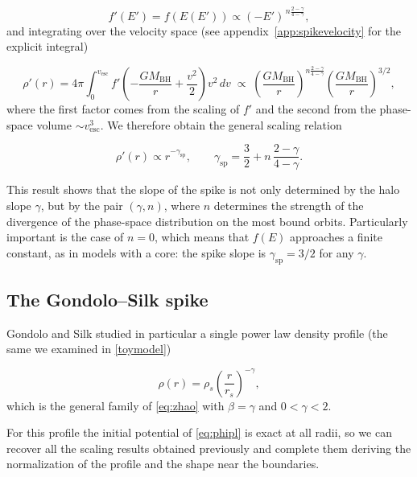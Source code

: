 \begin{equation}
    f'(E') = f\!\left(E(E')\right) \propto (-E')^{\,n\frac{2-\gamma}{4-\gamma}},
\end{equation}
and integrating over the velocity space (see appendix~\ref{app:spikevelocity} for
the explicit integral)

\begin{equation}
\rho'(r)
=
4\pi \int_{0}^{v_{\mathrm{esc}}}
f'\!\left( -\frac{GM_{\mathrm{BH}}}{r} + \frac{v^{2}}{2} \right) v^{2}\, dv
\;\propto\;
\left( \frac{GM_{\mathrm{BH}}}{r} \right)^{\! n\frac{2-\gamma}{4-\gamma}}
\left( \frac{GM_{\mathrm{BH}}}{r} \right)^{\! 3/2},
\end{equation}
where the first factor comes from the scaling of $f'$ and the second from the
phase-space volume $\sim v_{\mathrm{esc}}^{3}$. We therefore obtain the
general scaling relation

\begin{equation} \label{eq:generalslope}
\rho'(r) \propto r^{-\gamma_{\mathrm{sp}}},
\qquad
\gamma_{\mathrm{sp}} = \frac{3}{2} + n\, \frac{2-\gamma}{4-\gamma}.
\end{equation}

This result shows that the slope of the spike is not only determined
by the halo slope $\gamma$, but by the pair $(\gamma, n)$, where $n$
determines the strength of the divergence of the phase-space distribution
on the most bound orbits.
Particularly important is the case of $n = 0$, which means that $f(E)$ 
approaches a finite constant, as in models with a core: the spike slope 
is $\gamma_{\mathrm{sp}} = 3/2$ for any $\gamma$.



\subsection{The Gondolo--Silk spike}
\label{sec:GSspike}


Gondolo and Silk \cite{Gondolo_1999} studied in particular
a single power law density profile (the same we examined in \cref{toymodel})

\begin{equation}
    \rho(r) = \rho_s \left( \frac{r}{r_s} \right)^{-\gamma},
\end{equation}
which is the general family of \cref{eq:zhao} with $\beta = \gamma$ and $0<\gamma<2$. 

For this profile the initial potential of \cref{eq:phipl} is exact at all radii, so we
can recover all the scaling results obtained previously and complete them deriving 
the normalization of the profile and the shape near the boundaries.

